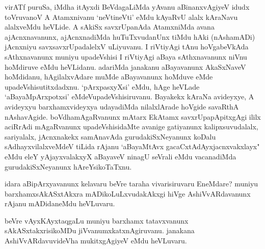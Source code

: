 \begin{artha}
virATf puruSa, iMdha itAyxdi BeVdagaLiMda yAvanu aBinanxvAgiyeV idudx toVruvanoV A Atamxnivanu `neVtineVti' eMdu kAyaRvU alalx kAraNavu alalxveMdu heVLide. A sAkiSx savxrUpanAda AtamxniMda avana ajAcnxnavanunx, ajAcnxnadiMda huTuTxvudanUnx tiMdu hAki (nAshamADi) jAcnxniyu savxsavxrUpadalelxV uLiyuvanu. I riVtiyAgi tAnu hoVgabeVkAda sAthxnavanunx muniyu upadeVshisi I riVtiyAgi aBaya sAthxnavanunx niVnu hoMdiruve eMdu heVLidanu. adariMda janakanu aBayavanunx AkaSxNaveV hoMdidanu, hAgilalxvAdare muMde aBayavanunx hoMduve eMde upadeVshisutitxdadxnu. `pArxpasxyXsi' eMdu, hAge heVLade `aBayaMpArxpotx\s si' eMdeV\break upadeVshisiruvanu. Bayakekx kAraNa avideyxye, A avideyxyu barxhamxvideyxya udayadiMda nilalxlArade hoVgide savaRthA nAshavAgide. boVdhamAgaRvanunx mAtarx EkAtamx savxrUpapApitxgAgi ililx aciRrAdi mAgaRvanunx upadeVshisidaMte avanige gatiyanunx kalipxsuvudalalx, sariyalalx, jAcnxnakekx samAnavAda gurudakiSxNeyanunx koDalu sAdhayxvilalxveMdeV tiLida rAjanu `aBayaMtAvx gacaCxtAdAyxjacnxvakxlayx" eMdu eleY yAjayxvalakxyX aBayaveV ninagU seVrali eMdu vacanadiMda gurudakiSxNeyanunx hAreYsikoTaTxnu.
\end{artha}


\begin{artha}
idara aBipArxyavanunx kelavaru beVre taraha vivarisiruvaru EneMdare? muniyu barxhamxsAkASxtAkxra mADikoLuLxvudakAkxgi hiVge AshiVvARdavanunx rAjanu mADidaneMdu heVLuvaru.
\end{artha}

\begin{artha}
beVre vAyxKAyxtaqgaLu muniyu barxhamx tatavxvanunx sAkASxtakxrisikoMDu jiVvanumxkatxnAgiruvanu. janakana AshiVvARdavuvideVha mukitxgAgiyeV eMdu heVLuvaru.
\end{artha}

